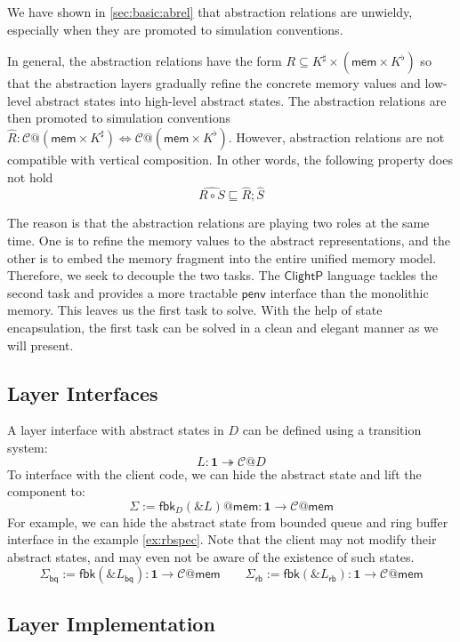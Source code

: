 \documentclass[acmsmall,screen,review,anonymous]{acmart}
\newcommand{\kw}[1]{\ensuremath{ \mathsf{#1} }}
\newcommand{\ClightP}{\ensuremath{ \mathsf{ClightP} }}
\begin{document}
We have shown in \ref{sec:basic:abrel} that
abstraction relations are unwieldy,
especially when they are promoted to simulation conventions.

In general, the abstraction relations have the form
$R \subseteq K^\sharp \times (\kw{mem} \times K^\flat)$
so that the abstraction layers gradually refine
the concrete memory values and low-level abstract states
into high-level abstract states.
The abstraction relations are then promoted to simulation conventions
$\hat{R}: \mathcal{C}@(\kw{mem}\times K^\sharp)
\Leftrightarrow \mathcal{C}@(\kw{mem}\times K^\flat)$.
However, abstraction relations are not compatible with
vertical composition.
In other words, the following property does not hold
\[
   \hat{R \circ S} \sqsubseteq \hat{R}; \hat{S}
\]

The reason is that the abstraction relations
are playing two roles at the same time.
One is to refine the memory values to the abstract representations,
and the other is to embed the memory fragment
into the entire unified memory model.
Therefore, we seek to decouple the two tasks.
The $\ClightP$ language tackles the second task
and provides a more tractable $\kw{penv}$ interface
than the monolithic memory.
This leaves us the first task to solve.
With the help of state encapsulation,
the first task can be solved in a clean and elegant manner
as we will present.

\subsection{Layer Interfaces} %

A layer interface with abstract states in $D$
can be defined using a transition system:
\[
  L : \mathbf{1} \twoheadrightarrow \mathcal{C}@D
\]
To interface with the client code,
we can hide the abstract state and lift the component to:
\[
  \Sigma := \kw{fbk}_D(\&L)@\kw{mem} : \mathbf{1} \rightarrow \mathcal{C}@\kw{mem}
\]
For example, we can hide the abstract state
from bounded queue and ring buffer interface in the example \ref{ex:rbspec}.
Note that the client may not modify their abstract states,
and may even not be aware of the existence of such states.
\[
  \Sigma_\kw{bq} := \kw{fbk}(\&L_\kw{bq}): \mathbf{1} \rightarrow \mathcal{C}@\kw{mem} \qquad
  \Sigma_\kw{rb} := \kw{fbk}(\&L_\kw{rb}): \mathbf{1} \rightarrow \mathcal{C}@\kw{mem}
\]


\subsection{Layer Implementation}
\label{sec:cal:impl}
\end{document}
